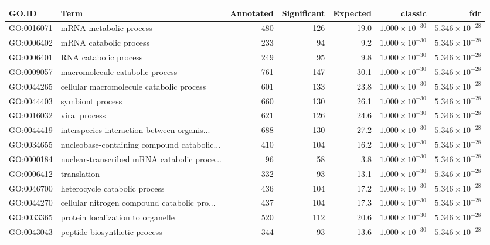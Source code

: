 \begin{table}[ht]
\centering
\begin{tabular}{llrrrrr}
  \hline
GO.ID & Term & Annotated & Significant & Expected & classic & fdr \\ 
  \hline
GO:0016071 & mRNA metabolic process & 480 & 126 & 19.0 & $1.000 \times 10^{-30}$ & $5.346 \times 10^{-28}$ \\ 
  GO:0006402 & mRNA catabolic process & 233 & 94 & 9.2 & $1.000 \times 10^{-30}$ & $5.346 \times 10^{-28}$ \\ 
  GO:0006401 & RNA catabolic process & 249 & 95 & 9.8 & $1.000 \times 10^{-30}$ & $5.346 \times 10^{-28}$ \\ 
  GO:0009057 & macromolecule catabolic process & 761 & 147 & 30.1 & $1.000 \times 10^{-30}$ & $5.346 \times 10^{-28}$ \\ 
  GO:0044265 & cellular macromolecule catabolic process & 601 & 133 & 23.8 & $1.000 \times 10^{-30}$ & $5.346 \times 10^{-28}$ \\ 
  GO:0044403 & symbiont process & 660 & 130 & 26.1 & $1.000 \times 10^{-30}$ & $5.346 \times 10^{-28}$ \\ 
  GO:0016032 & viral process & 621 & 126 & 24.6 & $1.000 \times 10^{-30}$ & $5.346 \times 10^{-28}$ \\ 
  GO:0044419 & interspecies interaction between organis... & 688 & 130 & 27.2 & $1.000 \times 10^{-30}$ & $5.346 \times 10^{-28}$ \\ 
  GO:0034655 & nucleobase-containing compound catabolic... & 410 & 104 & 16.2 & $1.000 \times 10^{-30}$ & $5.346 \times 10^{-28}$ \\ 
  GO:0000184 & nuclear-transcribed mRNA catabolic proce... & 96 & 58 & 3.8 & $1.000 \times 10^{-30}$ & $5.346 \times 10^{-28}$ \\ 
  GO:0006412 & translation & 332 & 93 & 13.1 & $1.000 \times 10^{-30}$ & $5.346 \times 10^{-28}$ \\ 
  GO:0046700 & heterocycle catabolic process & 436 & 104 & 17.2 & $1.000 \times 10^{-30}$ & $5.346 \times 10^{-28}$ \\ 
  GO:0044270 & cellular nitrogen compound catabolic pro... & 437 & 104 & 17.3 & $1.000 \times 10^{-30}$ & $5.346 \times 10^{-28}$ \\ 
  GO:0033365 & protein localization to organelle & 520 & 112 & 20.6 & $1.000 \times 10^{-30}$ & $5.346 \times 10^{-28}$ \\ 
  GO:0043043 & peptide biosynthetic process & 344 & 93 & 13.6 & $1.000 \times 10^{-30}$ & $5.346 \times 10^{-28}$ \\ 

\end{tabular}
\end{table}
